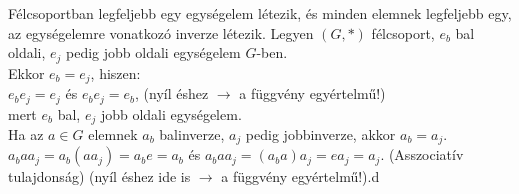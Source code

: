 \documentclass{beamer}
\begin{document}
\begin{frame}

\begin{tcolorbox}[title={Def.:Algebrai struktúrák, izomorfiájuk}]
\end{tcolorbox}

\begin{tcolorbox}[title={Def.: Műveleti zártság}]

\end{tcolorbox}

\begin{tcolorbox}[title={Def.: Grupoid}]
\tcblower
\end{tcolorbox}

\begin{tcolorbox}[title={Def.: Morfizmusok}]
\end{tcolorbox}

\begin{tcolorbox}[title={Def.: Félcsoport}]
\end{tcolorbox}

\begin{tcolorbox}[title={Def.: Baloldali, Jobboldali egységelem, Egységelem}]
\end{tcolorbox}
\end{frame}

\begin{frame}
\begin{tcolorbox}[title={Def.: Balinverz, Jobbinverz, Inverz (Félcsoport)}]
\end{tcolorbox}
\end{frame}


\begin{frame}
\begin{tcolorbox}[title={Tétel: Egységelem és inverz félcsoportban}]
Félcsoportban legfeljebb egy egységelem létezik, és minden elemnek legfeljebb egy, az egységelemre vonatkozó inverze létezik.
\tcblower
Legyen $(G, *)$ félcsoport, $e_b$ bal oldali, $e_j$ pedig jobb oldali egységelem $G$-ben.\\
Ekkor $e_b = e_j$, hiszen:\\
$e_be_j = e_j$ és $e_be_j = e_b$, (nyíl éshez $\rightarrow$ a függvény egyértelmű!)\\
mert $e_b$ bal, $e_j$ jobb oldali egységelem.\\
Ha az $a \in G$ elemnek $a_b$ balinverze, $a_j$ pedig jobbinverze, akkor $a_b = a_j$.
$a_baa_j = a_b(aa_j) = a_be = a_b$ és $a_baa_j = (a_ba)a_j = ea_j = a_j$. (Asszociatív tulajdonság) (nyíl éshez ide is $\rightarrow$ a függvény egyértelmű!).d
\end{tcolorbox}
\end{frame}
\end{document}
